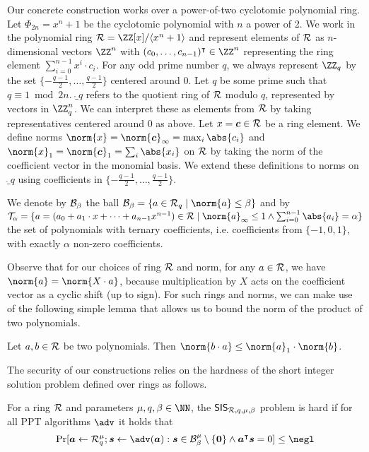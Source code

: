 Our concrete construction works over a power-of-two cyclotomic polynomial ring.
Let $\Phi_{2n} = x^n+1$ be the cyclotomic polynomial with $n$ a power of 2. 
We work in the polynomial ring $\ring =  \ZZ[x]/\langle x^n+1\rangle$ and represent elements of $\mathcal{R}$ as $n$-dimensional vectors $\ZZ^n$ with $(c_0,\dots,c_{n-1})^\transpose\in \ZZ^n$ representing the ring element $\sum_{i=0}^{n-1} x^i \cdot c_i$.
For any odd prime number $q$, we always represent $\ZZ_q$ by the set $\{-\tfrac{q-1}{2},\ldots,\tfrac{q-1}{2}\}$ centered around 0.
Let $q$  be some prime such that $q \equiv 1 \bmod 2n$.
$\ring_q$ refers to the quotient ring of $\mathcal{R}$ modulo $q$, represented by vectors in $\ZZ_q^n$. We can interpret these as elements from $\mathcal{R}$ by taking representatives centered around 0 as above.
Let $x = \boldsymbol{c} \in \mathcal{R}$ be a ring element.
We define norms $\norm{x} = \norm{\vec{c}}_\infty = \max_{i}\abs{c_i}$ and $\norm{x}_1 = \norm{\vec{c}}_1 = \sum_{i}\abs{x_i}$ on $\mathcal{R}$ by taking the norm of the coefficient vector in the monomial basis.
We extend these definitions to norms on $\ring_q$ using coefficients in $\{-\tfrac{q-1}{2},\ldots,\tfrac{q-1}{2}\}$.

We denote by $\mathcal{B}_\beta$ the ball $\ball_\beta = \{a\in\ring_q\mid \norm{a}\leq\beta\}$ and by 
$\tern_\alpha = \{a=(a_0+a_1\cdot x + \dots + a_{n-1}x^{n-1}) \in\ring \mid \norm{a}_\infty\leq 1 \land \sum_{i=0}^{n-1} \abs{a_i} = \alpha\}$ %
the set of polynomials with ternary coefficients, i.e. coefficients from $\{-1,0,1\}$, with exactly $\alpha$ non-zero coefficients.

Observe that for our choices of ring $\mathcal{R}$ and norm, for any $a\in\mathcal{R}$, we have $\norm{a} = \norm{X\cdot a}$, because multiplication by $X$ acts on the coefficient vector as a cyclic shift (up to sign).
For such rings and norms, we can make use of the following simple lemma that allows us to bound the norm of the product of two polynomials.
\begin{lemma}\label{lem:ternbound}
  Let $a,b\in\mathcal{R}$ be two polynomials. Then $\norm{b\cdot a} \leq \norm{a}_1\cdot\norm{b}$.
\end{lemma}

The security of our constructions relies on the hardness of the short integer solution problem defined over rings as follows.
\begin{definition}
  For a ring $\mathcal{R}$ and parameters $\mu,q,\beta \in \NN$, the $\mathsf{SIS}_{\mathcal{R},q,\mu,\beta}$ problem is hard if for all PPT algorithms $\adv$ it holds that
  \[
    \Pr[
      \vec{a} \gets \ring_q^\mu; \vec{s}\gets\adv(\vec{a}) : \vec{s}\in\ball_\beta^\mu\setminus\{\vec{0}\} \land \vec{a}^\transpose\vec{s}=0
    ] \leq \negl
  \]
\end{definition}
